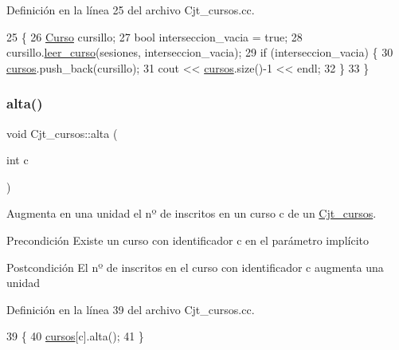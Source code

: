 Definición en la línea 25 del archivo Cjt\+\_\+cursos.\+cc.


\begin{DoxyCode}
25                                                        \{
26       \mbox{\hyperlink{class_curso}{Curso}} cursillo;
27       \textcolor{keywordtype}{bool} interseccion\_vacia = \textcolor{keyword}{true};
28       cursillo.\mbox{\hyperlink{class_curso_a35e0418ee2dba118a984c5f56d82c371}{leer\_curso}}(sesiones, interseccion\_vacia);
29       \textcolor{keywordflow}{if} (interseccion\_vacia) \{
30         \mbox{\hyperlink{class_cjt__cursos_a582f9540bc295212450dba4cd18c8886}{cursos}}.push\_back(cursillo);
31         cout << \mbox{\hyperlink{class_cjt__cursos_a582f9540bc295212450dba4cd18c8886}{cursos}}.size()-1 << endl;
32       \}
33     \}
\end{DoxyCode}
\mbox{\label{class_cjt__cursos_a974c8ac07471f9354fb13616a489f726}} 
\subsubsection{\texorpdfstring{alta()}{alta()}}
{\footnotesize\ttfamily void Cjt\+\_\+cursos\+::alta (\begin{DoxyParamCaption}\item[{int}]{c }\end{DoxyParamCaption})}



Augmenta en una unidad el nº de inscritos en un curso c de un \mbox{\hyperlink{class_cjt__cursos}{Cjt\+\_\+cursos}}. 

\begin{DoxyPrecond}{Precondición}
Existe un curso con identificador c en el parámetro implícito 
\end{DoxyPrecond}
\begin{DoxyPostcond}{Postcondición}
El nº de inscritos en el curso con identificador c augmenta una unidad 
\end{DoxyPostcond}


Definición en la línea 39 del archivo Cjt\+\_\+cursos.\+cc.


\begin{DoxyCode}
39                                \{
40       \mbox{\hyperlink{class_cjt__cursos_a582f9540bc295212450dba4cd18c8886}{cursos}}[c].alta();
41     \}
\end{DoxyCode}
\mbox{\label{class_cjt__cursos_a01b47ced7b3b96ea87775bb4e2f0302a}} 
